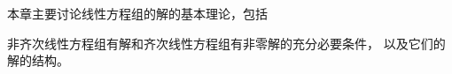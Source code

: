 \begin{frame}
  \begin{footnotesize}
    本章主要讨论线性方程组的解的基本理论，包括
    \begin{block}{}
      非齐次线性方程组有解和齐次线性方程组有非零解的充分必要条件，
      以及它们的解的结构。
    \end{block}
  \end{footnotesize}
\end{frame}

